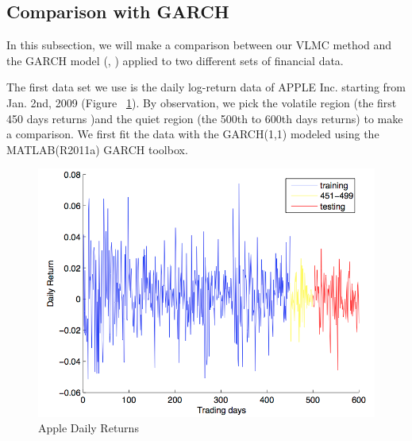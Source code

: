 \documentclass{beamer}
\begin{document}
\subsection{Comparison with GARCH}
\begin{frame}
\par In this subsection, we will make a comparison between our VLMC method and the GARCH model (\cite{GARCH:matlabtoolbox}, \cite{Garch: book}) applied to two different sets of financial data.
\par The first data set we use is the daily log-return data of APPLE Inc. starting from Jan. 2nd, 2009 (Figure ~\ref{fig:AppleDailyReturns}). By observation, we pick the volatile region (the first 450 days returns )and the quiet region (the 500th to 600th days returns) to make a comparison. We first fit the data with the GARCH(1,1) modeled using the MATLAB(R2011a) GARCH toolbox.

\end{frame}

\begin{frame}
\begin{figure}[h!]
\centering
\includegraphics[scale=0.45]{newpic2.png}
\caption[]{Apple Daily Returns}
\label{fig:AppleDailyReturns}
\end{figure}


\end{frame}
\end{document}

